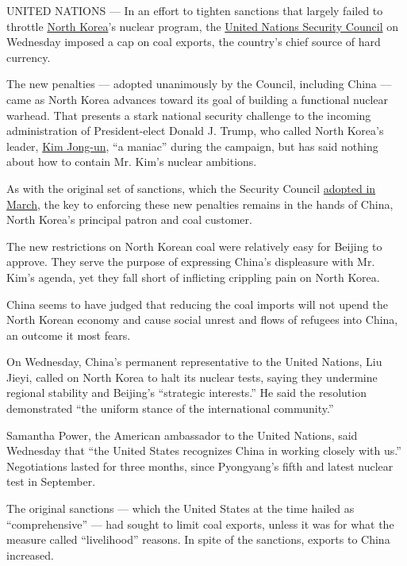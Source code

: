 UNITED NATIONS --- In an effort to tighten sanctions that largely failed
to throttle
\href{http://www.nytimes.com/topic/destination/north-korea?8qa}{North
Korea}'s nuclear program, the
\href{http://www.nytimes.com/topic/organization/security-council?8qa}{United
Nations Security Council} on Wednesday imposed a cap on coal exports,
the country's chief source of hard currency.

The new penalties --- adopted unanimously by the Council, including
China --- came as North Korea advances toward its goal of building a
functional nuclear warhead. That presents a stark national security
challenge to the incoming administration of President-elect Donald J.
Trump, who called North Korea's leader,
\href{http://www.nytimes.com/topic/person/kim-jongun?8qa}{Kim Jong-un},
``a maniac'' during the campaign, but has said nothing about how to
contain Mr. Kim's nuclear ambitions.

As with the original set of sanctions, which the Security Council
\href{http://www.nytimes.com/2016/03/03/world/asia/north-korea-un-sanctions.html}{adopted
in March}, the key to enforcing these new penalties remains in the hands
of China, North Korea's principal patron and coal customer.

The new restrictions on North Korean coal were relatively easy for
Beijing to approve. They serve the purpose of expressing China's
displeasure with Mr. Kim's agenda, yet they fall short of inflicting
crippling pain on North Korea.

China seems to have judged that reducing the coal imports will not upend
the North Korean economy and cause social unrest and flows of refugees
into China, an outcome it most fears.

On Wednesday, China's permanent representative to the United Nations,
Liu Jieyi, called on North Korea to halt its nuclear tests, saying they
undermine regional stability and Beijing's ``strategic interests.'' He
said the resolution demonstrated ``the uniform stance of the
international community.''

Samantha Power, the American ambassador to the United Nations, said
Wednesday that ``the United States recognizes China in working closely
with us.'' Negotiations lasted for three months, since Pyongyang's fifth
and latest nuclear test in September.

The original sanctions --- which the United States at the time hailed as
``comprehensive'' --- had sought to limit coal exports, unless it was
for what the measure called ``livelihood'' reasons. In spite of the
sanctions, exports to China increased.

